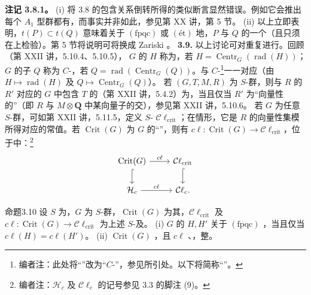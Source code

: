 \textbf{注记 3.8.1。} (i) 将 3.8 的包含关系倒转所得的类似断言显然错误。例如它会推出每个 $A_1$ 型群都有，而事实并非如此，参见第 XX 讲，第 5 节。
(ii) 以上立即表明，$t(P)\subset t(Q)$ 意味着关于 $(\mathrm{fpqc})$ 或 $(\text{ét})$ 地，$P$ 与 $Q$ 的一个（且只须在上检验）。第 5 节将说明可将换成 Zariski 。
\textbf{3.9.} 以上讨论可对重复进行。回顾（第 XXII 讲，5.10.4、5.10.5）， $G$ 的 $H$ 称为，若 $H=\operatorname{Centr}_G(\operatorname{rad}(H))$；$G$ 的子 $Q$ 称为 $C$-，若 $Q=\operatorname{rad}(\operatorname{Centr}_G(Q))$。与 $C$-\footnote{编者注：此处将“”改为“$C$-”，参见所引处。以下将简称“”。}一一对应（由 $H\mapsto\operatorname{rad}(H)$ 及 $Q\mapsto\operatorname{Centr}_G(Q)$）。
若 $(G,T,M,R)$ 为 $S$-群，则与 $R$ 的 $R'$ 对应的 $G$ 中包含 $T$ 的（第 XXII 讲，5.4.2）为，当且仅当 $R'$ 为“向量性的”（即 $R$ 与 $M\otimes\mathbf Q$ 中某向量子的交），参见第 XXII 讲，5.10.6。
若 $G$ 为任意 $S$-群，可如第 XXII 讲，5.11.5，定义 $S$- $\mathcal C\ell_{\mathrm{crit}}$；在情形，它是 $R$ 的向量性集模 所得对应的常值。若 $\operatorname{Crit}(G)$ 为 $G$ 的“”，则有 $c\ell:\operatorname{Crit}(G)\to\mathcal C\ell_{\mathrm{crit}}$，位于中：\footnote{编者注：$\mathcal H_c$ 及 $\mathcal C\ell_c$ 的记号参见 3.3 的脚注 (9)。}
\[\begin{tikzcd}
\operatorname{Crit}(G)\arrow[r,"c\ell"]\arrow[d,hook]&\mathcal C\ell_{\mathrm{crit}}\arrow[d,hook]\\
\mathcal H_c\arrow[r,"c\ell"]&\mathcal C\ell_c.
\end{tikzcd}\]
\begin{SGAresult}{命题}{3.10}
设 $S$ 为，$G$ 为 $S$-群，$\operatorname{Crit}(G)$ 为其，$\mathcal C\ell_{\mathrm{crit}}$ 及 $c\ell:\operatorname{Crit}(G)\to\mathcal C\ell_{\mathrm{crit}}$ 为上述 $S$-及。
(i) $G$ 的 $H,H'$ 关于 $(\mathrm{fpqc})$ ，当且仅当 $c\ell(H)=c\ell(H')$。
(ii) $\operatorname{Crit}(G)$ ，且 $c\ell$ 、，整。
\end{SGAresult}
